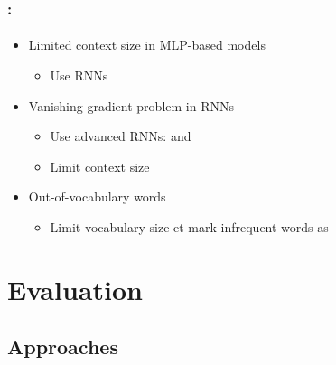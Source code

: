 \documentclass[xcolor=table]{beamer}
\begin{document}
\begin{frame}
	\frametitle{\insertshortsubtitle: \insertsection}
	\framesubtitle{\insertsubsection}

	\begin{itemize}
		\item Limited context size in MLP-based models
		\begin{itemize}
			\item Use RNNs
		\end{itemize}
		\item Vanishing gradient problem in RNNs
		\begin{itemize}
			\item Use advanced RNNs:  and 
			\item Limit context size
		\end{itemize}
		\item Out-of-vocabulary words
		\begin{itemize}
			\item Limit vocabulary size  et mark infrequent words as 
		\end{itemize}
	\end{itemize}

\end{frame}

\section{Evaluation}

\begin{frame}
	\frametitle{\insertshortsubtitle}
	\framesubtitle{\insertsection}
	
\end{frame}

\subsection{Approaches}
\end{document}
